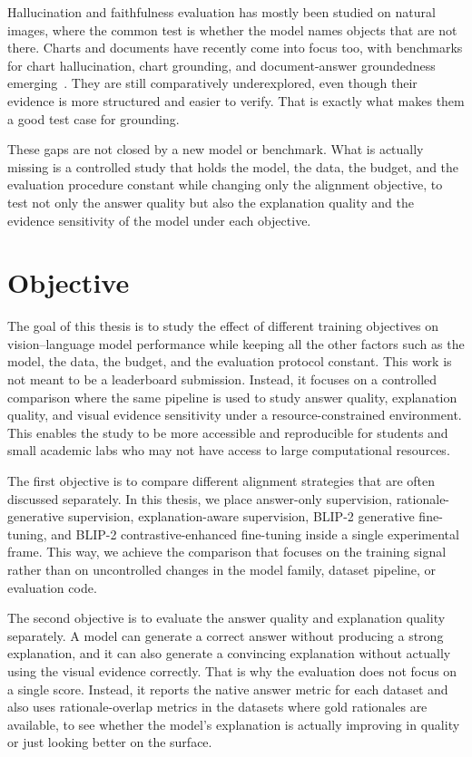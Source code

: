 \documentclass[12pt,bibliography=totoc,listof=totoc,BCOR=5mm,DIV=12,oneside,open=any]{scrbook}
\let\cite\citep
\begin{document}
Hallucination and faithfulness evaluation has mostly been studied on natural images, where the common test is whether the model names objects that are not there.
Charts and documents have recently come into focus too, with benchmarks for chart hallucination, chart grounding, and document-answer groundedness emerging~\cite{wang2025charthal,bansal2025chartab,chen2025docqa}.
They are still comparatively underexplored, even though their evidence is more structured and easier to verify.
That is exactly what makes them a good test case for grounding.

These gaps are not closed by a new model or benchmark. What is actually missing is a controlled study that holds the model, the data, the budget, 
and the evaluation procedure constant while changing only the alignment objective, to test not only the answer quality but also the explanation quality and the evidence sensitivity of the model under each objective.

\section{Objective}
The goal of this thesis is to study the effect of different training objectives on vision--language model performance
while keeping all the other factors such as the model, the data, the budget, and the evaluation protocol constant.
This work is not meant to be a leaderboard submission.
Instead, it focuses on a controlled comparison where the same pipeline is used to 
study answer quality, explanation quality, and visual evidence sensitivity under a resource-constrained environment.
This enables the study to be more accessible and reproducible for students and small academic labs who may not have access to large computational resources.

The first objective is to compare different alignment strategies that are often discussed separately.
In this thesis, we place answer-only supervision, rationale-generative supervision,
explanation-aware supervision, BLIP-2 generative fine-tuning, and BLIP-2 contrastive-enhanced fine-tuning inside a single experimental frame.
This way, we achieve the comparison that focuses on the training signal rather than on uncontrolled changes in the model family, dataset pipeline, or evaluation code.

The second objective is to evaluate the answer quality and explanation quality separately.
A model can generate a correct answer without producing a strong explanation,
and it can also generate a convincing explanation without actually using the visual evidence correctly.
That is why the evaluation does not focus on a single score.
Instead, it reports the native answer metric for each dataset and also uses rationale-overlap metrics in 
the datasets where gold rationales are available, to see whether the model's explanation is actually improving in quality or just looking better on the surface.
\end{document}
